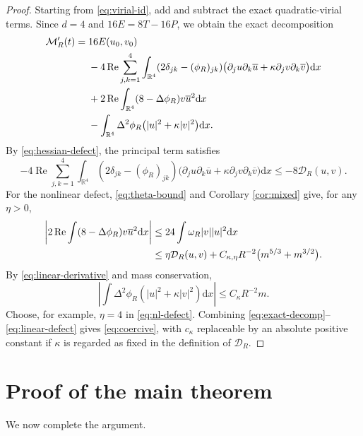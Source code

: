 \documentclass[12pt]{amsart}
\numberwithin{equation}{section}
\theoremstyle{remark}
\newcommand{\R}{\mathbb{R}}
\newcommand{\dd}{\mathrm{d}x}
\newcommand{\re}{\operatorname{Re}}
\begin{document}
\begin{proof}
Starting from \eqref{eq:virial-id}, add and subtract the exact quadratic-virial terms.  Since $d=4$ and $16E=8T-16P$, we obtain the exact decomposition
\begin{align}
 \mathcal M_R'(t)
 ={}&16E(u_0,v_0)\label{eq:exact-decomp}\\
 &-4\re\sum_{j,k=1}^4\int_{\R^4}
 (2\delta_{jk}-(\phi_R)_{jk})
 \big(\partial_ju\partial_k\overline u+\kappa\partial_jv\partial_k\overline v\big)\dd\notag\\
 &+2\re\int_{\R^4}(8-\Delta\phi_R)v\overline u^{2}\dd\notag\\
 &-\int_{\R^4}\Delta^2\phi_R\big(|u|^2+\kappa|v|^2\big)\dd.\notag
\end{align}
By \eqref{eq:hessian-defect}, the principal term satisfies
\begin{equation}\label{eq:principal}
 -4\re\sum_{j,k=1}^4\int_{\R^4}
 (2\delta_{jk}-(\phi_R)_{jk})
 \big(\partial_ju\partial_k\overline u+\kappa\partial_jv\partial_k\overline v\big)\dd
 \le -8\mathcal D_R(u,v).
\end{equation}
For the nonlinear defect, \eqref{eq:theta-bound} and Corollary \ref{cor:mixed} give, for any $\eta>0$,
\begin{align}
 \left|2\re\int(8-\Delta\phi_R)v\overline u^{2}\dd\right|
 &\le24\int\omega_R|v||u|^2\dd\notag\\
 &\le \eta\mathcal D_R(u,v)
 +C_{\kappa,\eta}R^{-2}\big(m^{5/3}+m^{3/2}\big).
 \label{eq:nl-defect}
\end{align}
By \eqref{eq:linear-derivative} and mass conservation,
\begin{equation}\label{eq:linear-defect}
 \left|\int\Delta^2\phi_R(|u|^2+\kappa|v|^2)\dd\right|
 \le C_\kappa R^{-2}m.
\end{equation}
Choose, for example, $\eta=4$ in \eqref{eq:nl-defect}.  Combining \eqref{eq:exact-decomp}--\eqref{eq:linear-defect} gives \eqref{eq:coercive}, with $c_\kappa$ replaceable by an absolute positive constant if $\kappa$ is regarded as fixed in the definition of $\mathcal D_R$.
\end{proof}

\section{Proof of the main theorem}\label{sec:riccati}

We now complete the argument.
\end{document}
